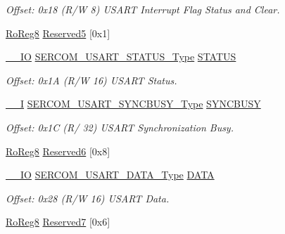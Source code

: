 \begin{DoxyCompactItemize}
\begin{DoxyCompactList}\small\item\em Offset\+: 0x18 (R/W 8) U\+S\+A\+RT Interrupt Flag Status and Clear. \end{DoxyCompactList}\item 
\mbox{\hyperlink{group___s_a_m_d21_e15_a__definitions_ga0d957f1433aaf5d70e4dc2b68288442d}{Ro\+Reg8}} \mbox{\hyperlink{struct_sercom_usart_a7321f81c873f0c6c846004e246ac204d}{Reserved5}} \mbox{[}0x1\mbox{]}
\item 
\mbox{\hyperlink{core__cm0plus_8h_aec43007d9998a0a0e01faede4133d6be}{\+\_\+\+\_\+\+IO}} \mbox{\hyperlink{union_s_e_r_c_o_m___u_s_a_r_t___s_t_a_t_u_s___type}{S\+E\+R\+C\+O\+M\+\_\+\+U\+S\+A\+R\+T\+\_\+\+S\+T\+A\+T\+U\+S\+\_\+\+Type}} \mbox{\hyperlink{struct_sercom_usart_af2fa4c08ef332c01ef46d739b16fa7e8}{S\+T\+A\+T\+US}}
\begin{DoxyCompactList}\small\item\em Offset\+: 0x1A (R/W 16) U\+S\+A\+RT Status. \end{DoxyCompactList}\item 
\mbox{\hyperlink{core__cm0plus_8h_af63697ed9952cc71e1225efe205f6cd3}{\+\_\+\+\_\+I}} \mbox{\hyperlink{union_s_e_r_c_o_m___u_s_a_r_t___s_y_n_c_b_u_s_y___type}{S\+E\+R\+C\+O\+M\+\_\+\+U\+S\+A\+R\+T\+\_\+\+S\+Y\+N\+C\+B\+U\+S\+Y\+\_\+\+Type}} \mbox{\hyperlink{struct_sercom_usart_a9e26ef039a3b22ffae20b3dbf58aca8e}{S\+Y\+N\+C\+B\+U\+SY}}
\begin{DoxyCompactList}\small\item\em Offset\+: 0x1C (R/ 32) U\+S\+A\+RT Synchronization Busy. \end{DoxyCompactList}\item 
\mbox{\hyperlink{group___s_a_m_d21_e15_a__definitions_ga0d957f1433aaf5d70e4dc2b68288442d}{Ro\+Reg8}} \mbox{\hyperlink{struct_sercom_usart_a6c79c87b5bf6d0b4a196f3f6840b82e5}{Reserved6}} \mbox{[}0x8\mbox{]}
\item 
\mbox{\hyperlink{core__cm0plus_8h_aec43007d9998a0a0e01faede4133d6be}{\+\_\+\+\_\+\+IO}} \mbox{\hyperlink{union_s_e_r_c_o_m___u_s_a_r_t___d_a_t_a___type}{S\+E\+R\+C\+O\+M\+\_\+\+U\+S\+A\+R\+T\+\_\+\+D\+A\+T\+A\+\_\+\+Type}} \mbox{\hyperlink{struct_sercom_usart_a9825560cef3f31ff34e49aa417eb1f64}{D\+A\+TA}}
\begin{DoxyCompactList}\small\item\em Offset\+: 0x28 (R/W 16) U\+S\+A\+RT Data. \end{DoxyCompactList}\item 
\mbox{\hyperlink{group___s_a_m_d21_e15_a__definitions_ga0d957f1433aaf5d70e4dc2b68288442d}{Ro\+Reg8}} \mbox{\hyperlink{struct_sercom_usart_a5891c237f5fdeda00422d34c05413f62}{Reserved7}} \mbox{[}0x6\mbox{]}

\end{DoxyCompactItemize}
